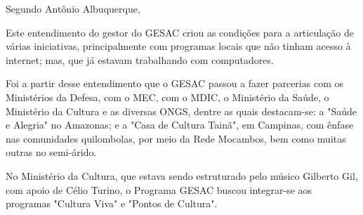 Segundo Antônio Albuquerque,


\noindent\begin{flushright}\mbox{\linespread{1}\selectfont\centering{}}\end{flushright}


Este entendimento do gestor do GESAC criou as condições para a articulação de várias iniciativas, principalmente com programas locais que não tinham acesso à internet; mas, que já estavam trabalhando com computadores.

Foi a partir desse entendimento que o GESAC passou a fazer parcerias com os Ministérios da Defesa, com o MEC, com o MDIC, o Ministério da Saúde, o Ministério da Cultura e as diversas ONGS, dentre as quais destacam-se: a "Saúde e Alegria" no Amazonas; e a "Casa de Cultura Tainã", em Campinas, com ênfase nas comunidades quilombolas, por meio da Rede Mocambos, bem como muitas outras no semi-árido.


\noindent\begin{flushright}\mbox{\linespread{1}\selectfont\centering{}}\end{flushright}


No Ministério da Cultura, que estava sendo estruturado pelo músico Gilberto Gil, com apoio de Célio Turino, o Programa GESAC buscou integrar-se aos programas "Cultura Viva" e "Pontos de Cultura".


